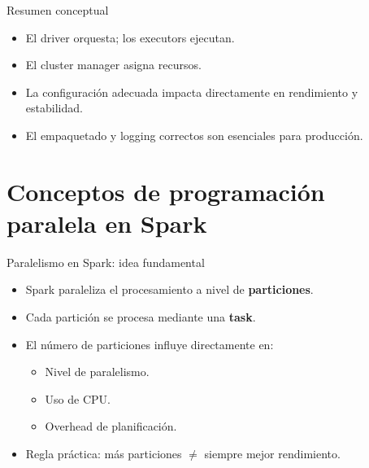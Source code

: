 \documentclass{beamer}
\begin{document}
\begin{frame}{Resumen conceptual}
\begin{itemize}
  \item El driver orquesta; los executors ejecutan.
  \item El cluster manager asigna recursos.
  \item La configuración adecuada impacta directamente en rendimiento y estabilidad.
  \item El empaquetado y logging correctos son esenciales para producción.
\end{itemize}
\end{frame}

\section{Conceptos de programación paralela en Spark}

\begin{frame}{Paralelismo en Spark: idea fundamental}
\begin{itemize}
  \item Spark paraleliza el procesamiento a nivel de \textbf{particiones}.
  \item Cada partición se procesa mediante una \textbf{task}.
  \item El número de particiones influye directamente en:
  \begin{itemize}
    \item Nivel de paralelismo.
    \item Uso de CPU.
    \item Overhead de planificación.
  \end{itemize}
  \item Regla práctica: más particiones $\neq$ siempre mejor rendimiento.
\end{itemize}
\end{frame}
\end{document}
